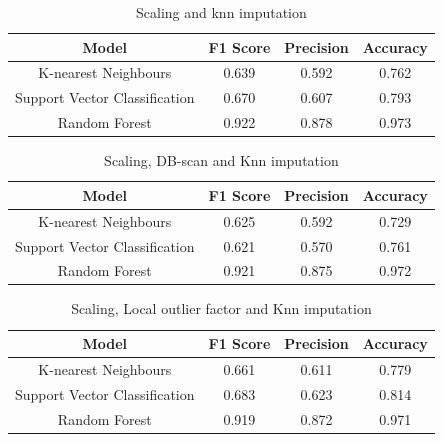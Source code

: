 \documentclass[a4paper]{article}
\begin{document}

\begin{table}[H]
    \centering
    \begin{tabular}{|c|c|c|c|}
    \hline
      Model & F1 Score & Precision & Accuracy \\
    \hline
         K-nearest Neighbours & 0.639 & 0.592 & 0.762 \\
    \hline
        Support Vector Classification & 0.670 & 0.607 &0.793 \\
    \hline
         Random Forest & 0.922 & 0.878 & 0.973 \\
    \hline
    \end{tabular}
    \caption{Scaling and knn imputation}
    \label{tab:my_label}
\end{table}


\begin{table}[H]
    \centering
    \begin{tabular}{|c|c|c|c|}
    \hline
         Model & F1 Score  & Precision  & Accuracy  \\
    \hline
         K-nearest Neighbours & 0.625 & 0.592 & 0.729 \\
    \hline
    Support Vector Classification & 0.621 & 0.570 & 0.761 \\
    \hline
         Random Forest & 0.921 & 0.875 & 0.972 \\
    \hline
    \end{tabular}
    \caption{Scaling, DB-scan and Knn imputation}
    \label{tab:my_label}
\end{table}


\begin{table}[H]
    \centering
    \begin{tabular}{|c|c|c|c|}
    \hline
         Model & F1 Score & Precision & Accuracy \\
    \hline
         K-nearest Neighbours & 0.661 & 0.611 & 0.779 \\
    \hline
         Support Vector Classification & 0.683 & 0.623 & 0.814 \\
    \hline
         Random Forest & 0.919 & 0.872 & 0.971 \\
    \hline
    \end{tabular}
    \caption{Scaling, Local outlier factor and Knn imputation}
    \label{tab:my_label}
\end{table}
\end{document}
